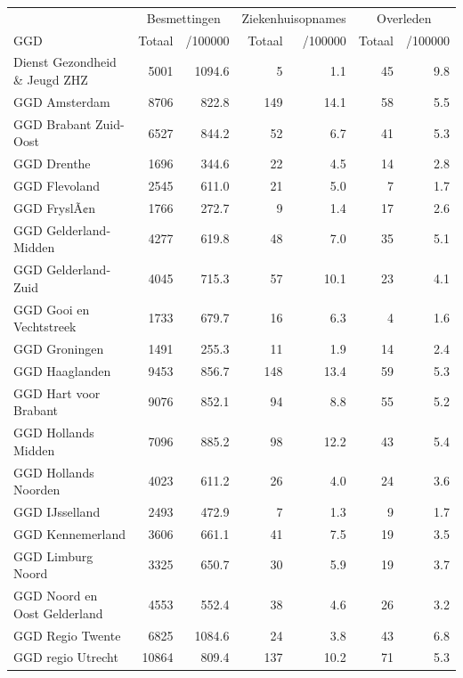 \documentclass[
  english,
  man,floatsintext]{apa6}
\begin{document}
\begin{table}[H]
\centering\begingroup\fontsize{10}{12}\selectfont

\begin{threeparttable}
\begin{tabular}{lrrrrrr}
\toprule
\multicolumn{1}{c}{ } & \multicolumn{2}{c}{Besmettingen} & \multicolumn{2}{c}{Ziekenhuisopnames} & \multicolumn{2}{c}{Overleden} \\
\cmidrule(l{3pt}r{3pt}){2-3} \cmidrule(l{3pt}r{3pt}){4-5} \cmidrule(l{3pt}r{3pt}){6-7}
GGD & Totaal & /100000 & Totaal & /100000 & Totaal & /100000\\
\midrule
Dienst Gezondheid \& Jeugd ZHZ & 5001 & 1094.6 & 5 & 1.1 & 45 & 9.8\\
GGD Amsterdam & 8706 & 822.8 & 149 & 14.1 & 58 & 5.5\\
GGD Brabant Zuid-Oost & 6527 & 844.2 & 52 & 6.7 & 41 & 5.3\\
GGD Drenthe & 1696 & 344.6 & 22 & 4.5 & 14 & 2.8\\
GGD Flevoland & 2545 & 611.0 & 21 & 5.0 & 7 & 1.7\\
GGD FryslÃ¢n & 1766 & 272.7 & 9 & 1.4 & 17 & 2.6\\
GGD Gelderland-Midden & 4277 & 619.8 & 48 & 7.0 & 35 & 5.1\\
GGD Gelderland-Zuid & 4045 & 715.3 & 57 & 10.1 & 23 & 4.1\\
GGD Gooi en Vechtstreek & 1733 & 679.7 & 16 & 6.3 & 4 & 1.6\\
GGD Groningen & 1491 & 255.3 & 11 & 1.9 & 14 & 2.4\\
GGD Haaglanden & 9453 & 856.7 & 148 & 13.4 & 59 & 5.3\\
GGD Hart voor Brabant & 9076 & 852.1 & 94 & 8.8 & 55 & 5.2\\
GGD Hollands Midden & 7096 & 885.2 & 98 & 12.2 & 43 & 5.4\\
GGD Hollands Noorden & 4023 & 611.2 & 26 & 4.0 & 24 & 3.6\\
GGD IJsselland & 2493 & 472.9 & 7 & 1.3 & 9 & 1.7\\
GGD Kennemerland & 3606 & 661.1 & 41 & 7.5 & 19 & 3.5\\
GGD Limburg Noord & 3325 & 650.7 & 30 & 5.9 & 19 & 3.7\\
GGD Noord en Oost Gelderland & 4553 & 552.4 & 38 & 4.6 & 26 & 3.2\\
GGD Regio Twente & 6825 & 1084.6 & 24 & 3.8 & 43 & 6.8\\
GGD regio Utrecht & 10864 & 809.4 & 137 & 10.2 & 71 & 5.3\\

\end{tabular}
\end{threeparttable}
\end{table}
\end{document}
